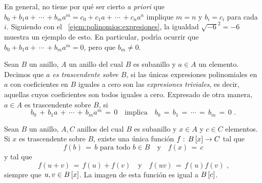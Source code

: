 \begin{obsPolinomios}\label{obs:polinomios:trascendente}
	En general, no tiene por qu\'e ser cierto \emph{a priori} que
	\begin{math}
		b_0+b_1a+\,\cdots\,+b_ma^m= c_0+c_1a+\,\cdots\,+c_na^n
	\end{math}
	implique $m=n$ y $b_i=c_i$ para cada $i$.
	Siguiendo con el \ejemname~\ref{ejem:polinomios:expresiones},
	la igualdad $\sqrt{-6}^2=-6$ muestra un ejemplo de esto.
	En particular, podr\'{\i}a ocurrir que
	\begin{math}
		b_0+b_1a+\,\cdots\,+b_ma^m=0
	\end{math},
	pero que $b_m\neq 0$.
\end{obsPolinomios}

\begin{defPolinomios}\label{def:polinomios:trascendente}
	Sean $B$ un anillo, $A$ un anillo del cual $B$ es subanillo
	y $a\in A$ un elemento.
	Decimos que \emph{$a$ es trascendente sobre $B$}, si las \'unicas
	expresiones polinomiales en $a$ con coeficientes en $B$ iguales a cero
	son las \emph{expresiones triviales}, es decir, aquellas cuyos
	coeficientes son todos iguales a cero.
	Expresado de otra manera, $a\in A$ es trascendente sobre $B$, si
	\begin{displaymath}
		b_0\,+\,b_1a\,+\,\cdots\,+\,b_ma^m\,=\,0
		\quad\text{implica}\quad b_0\,=\,b_1\,=\,\cdots\,=\,b_m\,=\,0
		\text{ .}
	\end{displaymath}
\end{defPolinomios}

\begin{teoPolinomios}\label{teo:polinomios:trascendente}
	Sean $B$ un anillo, $A,C$ anillos del cual $B$ es subanillo y
	$x\in A$ y $c\in C$ elementos.
	Si $x$ es trascendente sobre $B$, existe una \'unica funci\'on
	$f:\,{B}\left[x\right]\rightarrow C$ tal que
	\begin{displaymath}
		f(b)\,=\,b\text{ para todo }b\in B
			\quad\text{y}\quad f(x)\,=\,c
	\end{displaymath}
	y tal que 
	\begin{displaymath}
		f(u+v)\,=\,f(u)+f(v)\quad\text{y}\quad f(uv)\,=\,f(u)f(v)
		\text{ ,}
	\end{displaymath}
	siempre que $u,v\in{B}\left[x\right]$. La imagen de esta funci\'on
	es igual a ${B}\left[c\right]$.
\end{teoPolinomios}

